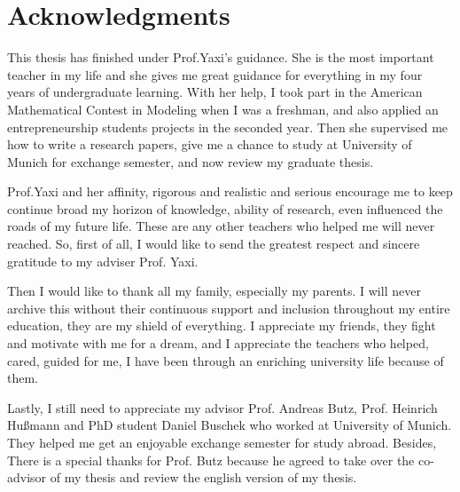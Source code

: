 \chapter*{Acknowledgments}

This thesis has finished under Prof.Yaxi's guidance. She is the most important teacher in my life and she gives me great guidance for everything in my four years of undergraduate learning.
With her help, I took part in the American Mathematical Contest in Modeling when I was a freshman, and also applied an entrepreneurship students projects in the seconded year. Then she supervised me how to write a research papers, give me a chance to study at University of Munich for exchange semester, and now review my graduate thesis.

Prof.Yaxi and her affinity, rigorous and realistic and serious encourage me to keep continue broad my horizon of knowledge, ability of research, even influenced the roads of my future life. These are any other teachers who helped me will never reached. So, first of all, I would like to send the greatest respect and sincere gratitude to my adviser Prof. Yaxi.

Then I would like to thank all my family, especially my parents. I will never archive this without their continuous support and inclusion throughout my entire education, they are my shield of everything.
I appreciate my friends, they fight and motivate with me for a dream, and I appreciate the teachers who helped, cared, guided for me, I have been through an enriching university life because of them.

Lastly, I still need to appreciate my advisor Prof. Andreas Butz, Prof. Heinrich Hußmann and PhD student Daniel Buschek who worked at University of Munich. They helped me get an enjoyable exchange semester for study abroad. Besides, There is a special thanks for Prof. Butz because he agreed to take over the co-advisor of my thesis and review the english version of my thesis.

